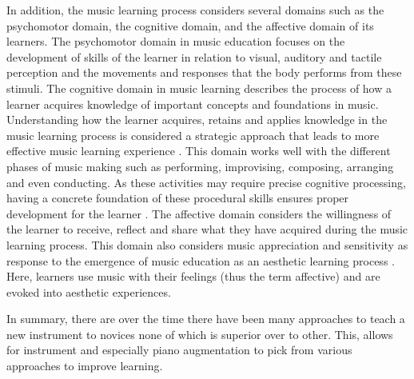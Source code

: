 \documentclass[sigchi, review]{acmart}
\begin{document}
In addition, the music learning process considers several domains such as the psychomotor domain, the cognitive domain, and the affective domain of its learners. The psychomotor domain in music education focuses on the development of skills of the learner in relation to visual, auditory and tactile perception \cite{simpson1966classification} and the movements and responses that the body performs from these stimuli. The cognitive domain in music learning describes the process of how a learner acquires knowledge of important concepts and foundations in music. Understanding how the learner acquires, retains and applies knowledge in the music learning process is considered a strategic approach that leads to more effective music learning experience \cite{hanna2007new}. This domain works well with the different phases of music making such as performing, improvising, composing, arranging and even conducting. As these activities may require precise cognitive processing, having a concrete foundation of these procedural skills ensures proper development for the learner \cite{westerlund2003reconsidering}. The affective domain considers the willingness of the learner to receive, reflect and share what they have acquired during the music learning process. This domain also considers music appreciation and sensitivity as response to the emergence of music education as an aesthetic learning process \cite{mccarthy2002music}. Here, learners use music with their feelings (thus the term affective) and are evoked into aesthetic experiences. 

In summary, there are over the time there have been many approaches to teach a new instrument to novices none of which is superior over to other. This, allows for instrument and especially piano augmentation to pick from various approaches to improve learning. 



\end{document}
